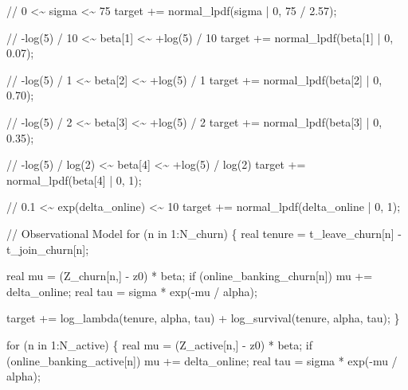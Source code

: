 \documentclass[
  letterpaper,
  DIV=11,
  numbers=noendperiod]{scrartcl}
\newenvironment{Shaded}{\begin{snugshade}}{\end{snugshade}}
\newcommand{\CommentTok}[1]{\textcolor[rgb]{0.37,0.37,0.37}{#1}}
\newcommand{\ControlFlowTok}[1]{\textcolor[rgb]{0.00,0.23,0.31}{#1}}
\newcommand{\DataTypeTok}[1]{\textcolor[rgb]{0.68,0.00,0.00}{#1}}
\newcommand{\DecValTok}[1]{\textcolor[rgb]{0.68,0.00,0.00}{#1}}
\newcommand{\FloatTok}[1]{\textcolor[rgb]{0.68,0.00,0.00}{#1}}
\newcommand{\KeywordTok}[1]{\textcolor[rgb]{0.00,0.23,0.31}{#1}}
\newcommand{\NormalTok}[1]{\textcolor[rgb]{0.00,0.23,0.31}{#1}}
\begin{document}
\begin{codelisting}
\begin{Shaded}
\begin{Highlighting}[]
  \CommentTok{// 0 \textless{}\textasciitilde{} sigma \textless{}\textasciitilde{} 75}
  \KeywordTok{target +=}\NormalTok{ normal\_lpdf(sigma | }\DecValTok{0}\NormalTok{, }\DecValTok{75}\NormalTok{ / }\FloatTok{2.57}\NormalTok{);}

  \CommentTok{// {-}log(5) / 10 \textless{}\textasciitilde{} beta[1] \textless{}\textasciitilde{} +log(5) / 10}
  \KeywordTok{target +=}\NormalTok{ normal\_lpdf(beta[}\DecValTok{1}\NormalTok{] | }\DecValTok{0}\NormalTok{, }\FloatTok{0.07}\NormalTok{);}

  \CommentTok{// {-}log(5) / 1 \textless{}\textasciitilde{} beta[2] \textless{}\textasciitilde{} +log(5) / 1}
  \KeywordTok{target +=}\NormalTok{ normal\_lpdf(beta[}\DecValTok{2}\NormalTok{] | }\DecValTok{0}\NormalTok{, }\FloatTok{0.70}\NormalTok{);}

  \CommentTok{// {-}log(5) / 2 \textless{}\textasciitilde{} beta[3] \textless{}\textasciitilde{} +log(5) / 2}
  \KeywordTok{target +=}\NormalTok{ normal\_lpdf(beta[}\DecValTok{3}\NormalTok{] | }\DecValTok{0}\NormalTok{, }\FloatTok{0.35}\NormalTok{);}

  \CommentTok{// {-}log(5) / log(2) \textless{}\textasciitilde{} beta[4] \textless{}\textasciitilde{} +log(5) / log(2)}
  \KeywordTok{target +=}\NormalTok{ normal\_lpdf(beta[}\DecValTok{4}\NormalTok{] | }\DecValTok{0}\NormalTok{, }\DecValTok{1}\NormalTok{);}

  \CommentTok{// 0.1 \textless{}\textasciitilde{} exp(delta\_online) \textless{}\textasciitilde{} 10}
  \KeywordTok{target +=}\NormalTok{ normal\_lpdf(delta\_online | }\DecValTok{0}\NormalTok{, }\DecValTok{1}\NormalTok{);}

  \CommentTok{// Observational Model}
  \ControlFlowTok{for}\NormalTok{ (n }\ControlFlowTok{in} \DecValTok{1}\NormalTok{:N\_churn) \{}
    \DataTypeTok{real}\NormalTok{ tenure = t\_leave\_churn[n] {-} t\_join\_churn[n];}

    \DataTypeTok{real}\NormalTok{ mu = (Z\_churn[n,] {-} z0) * beta;}
    \ControlFlowTok{if}\NormalTok{ (online\_banking\_churn[n])}
\NormalTok{      mu += delta\_online;}
    \DataTypeTok{real}\NormalTok{ tau = sigma * exp({-}mu / alpha);}

    \KeywordTok{target +=}\NormalTok{   log\_lambda(tenure, alpha, tau)}
\NormalTok{              + log\_survival(tenure, alpha, tau);}
\NormalTok{  \}}

  \ControlFlowTok{for}\NormalTok{ (n }\ControlFlowTok{in} \DecValTok{1}\NormalTok{:N\_active) \{}
    \DataTypeTok{real}\NormalTok{ mu = (Z\_active[n,] {-} z0) * beta;}
    \ControlFlowTok{if}\NormalTok{ (online\_banking\_active[n])}
\NormalTok{      mu += delta\_online;}
    \DataTypeTok{real}\NormalTok{ tau = sigma * exp({-}mu / alpha);}


\end{Highlighting}
\end{Shaded}
\end{codelisting}
\end{document}
